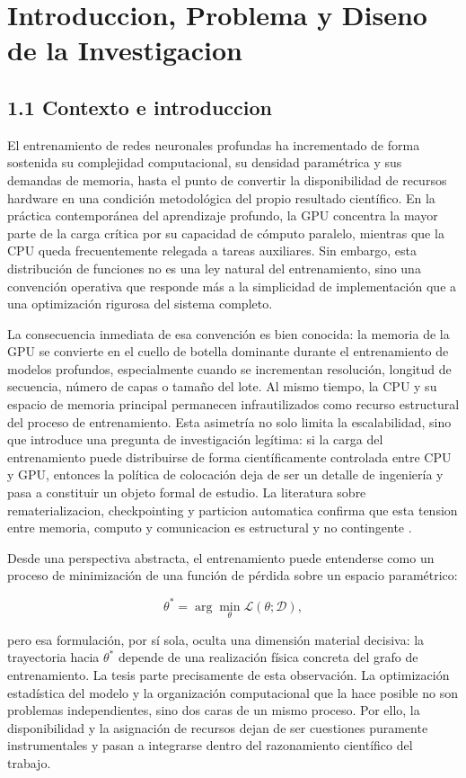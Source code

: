 \chapter{Introduccion, Problema y Diseno de la Investigacion}

\section{1.1 Contexto e introduccion}
El entrenamiento de redes neuronales profundas ha incrementado de forma sostenida su complejidad computacional, su densidad paramétrica y sus demandas de memoria, hasta el punto de convertir la disponibilidad de recursos hardware en una condición metodológica del propio resultado científico. En la práctica contemporánea del aprendizaje profundo, la GPU concentra la mayor parte de la carga crítica por su capacidad de cómputo paralelo, mientras que la CPU queda frecuentemente relegada a tareas auxiliares. Sin embargo, esta distribución de funciones no es una ley natural del entrenamiento, sino una convención operativa que responde más a la simplicidad de implementación que a una optimización rigurosa del sistema completo.

La consecuencia inmediata de esa convención es bien conocida: la memoria de la GPU se convierte en el cuello de botella dominante durante el entrenamiento de modelos profundos, especialmente cuando se incrementan resolución, longitud de secuencia, número de capas o tamaño del lote. Al mismo tiempo, la CPU y su espacio de memoria principal permanecen infrautilizados como recurso estructural del proceso de entrenamiento. Esta asimetría no solo limita la escalabilidad, sino que introduce una pregunta de investigación legítima: si la carga del entrenamiento puede distribuirse de forma científicamente controlada entre CPU y GPU, entonces la política de colocación deja de ser un detalle de ingeniería y pasa a constituir un objeto formal de estudio. La literatura sobre rematerializacion, checkpointing y particion automatica confirma que esta tension entre memoria, computo y comunicacion es estructural y no contingente \cite{griewank2000revolve,chen2016sublinear,mirhoseini2017device,jia2019beyond}.

Desde una perspectiva abstracta, el entrenamiento puede entenderse como un proceso de minimización de una función de pérdida sobre un espacio paramétrico:

$$
\theta^* = \arg\min_{\theta} \mathcal{L}(\theta; \mathcal{D}),
$$

pero esa formulación, por sí sola, oculta una dimensión material decisiva: la trayectoria hacia $\theta^*$ depende de una realización física concreta del grafo de entrenamiento. La tesis parte precisamente de esta observación. La optimización estadística del modelo y la organización computacional que la hace posible no son problemas independientes, sino dos caras de un mismo proceso. Por ello, la disponibilidad y la asignación de recursos dejan de ser cuestiones puramente instrumentales y pasan a integrarse dentro del razonamiento científico del trabajo.

